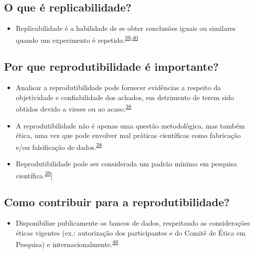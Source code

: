 \documentclass[
  a4paper,
]{book}
\providecommand{\tightlist}{%
  \setlength{\itemsep}{0pt}\setlength{\parskip}{0pt}}
\begin{document}
\hypertarget{o-que-uxe9-replicabilidade}{%
\subsection{O que é replicabilidade?}\label{o-que-uxe9-replicabilidade}}

\begin{itemize}
\tightlist
\item
  Replicabilidade é a habilidade de se obter conclusões iguais ou similares quando um experimento é repetido.\textsuperscript{\protect\hyperlink{ref-hofner2015}{39},\protect\hyperlink{ref-mair2016}{40}}
\end{itemize}

\hypertarget{por-que-reprodutibilidade-uxe9-importante}{%
\subsection{Por que reprodutibilidade é importante?}\label{por-que-reprodutibilidade-uxe9-importante}}

\begin{itemize}
\item
  Analisar a reprodutibilidade pode fornecer evidências a respeito da objetividade e confiabilidade dos achados, em detrimento de terem sido obtidos devido a vieses ou ao acaso.\textsuperscript{\protect\hyperlink{ref-resnik2016}{38}}
\item
  A reprodutibilidade não é apenas uma questão metodológica, mas também ética, uma vez que pode envolver mal práticas científicas como fabricação e/ou falsificação de dados.\textsuperscript{\protect\hyperlink{ref-resnik2016}{38}}
\item
  Reprodutibilidade pode ser considerada um padrão mínimo em pesquisa científica.\textsuperscript{\protect\hyperlink{ref-hofner2015}{39}}{]}
\end{itemize}

\hypertarget{como-contribuir-para-a-reprodutibilidade}{%
\subsection{Como contribuir para a reprodutibilidade?}\label{como-contribuir-para-a-reprodutibilidade}}

\begin{itemize}
\tightlist
\item
  Disponibilize publicamente os bancos de dados, respeitando as considerações éticas vigentes (ex.: autorização dos participantes e do Comitê de Ética em Pesquisa) e internacionalmente.\textsuperscript{\protect\hyperlink{ref-mair2016}{40}}
\end{itemize}
\end{document}
